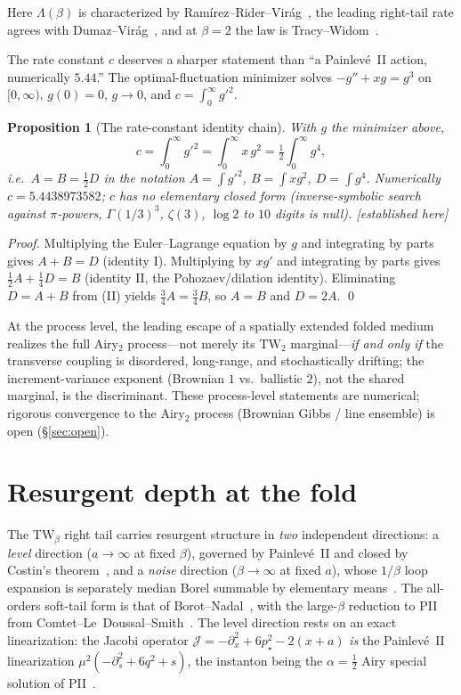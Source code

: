 \documentclass[11pt,reqno]{amsart}
\theoremstyle{plain}
\newtheorem{proposition}[theorem]{Proposition}
\theoremstyle{definition}
\theoremstyle{remark}
\newcommand{\TW}{\mathrm{TW}}
\newcommand{\tagPr}{{\footnotesize\textsf{[established here]}}}
\begin{document}
Here $\Lambda(\beta)$ is characterized by Ram\'irez--Rider--Vir\'ag~\cite{RRV}, the leading right-tail
rate agrees with Dumaz--Vir\'ag~\cite{DV}, and at $\beta{=}2$ the law is Tracy--Widom~\cite{TW1994,Bornemann}.

The rate constant $c$ deserves a sharper statement than ``a Painlev\'e~II action, numerically
$5.44$.'' The optimal-fluctuation minimizer solves $-g''+xg=g^3$ on $[0,\infty)$, $g(0)=0$,
$g\to0$, and $c=\int_0^\infty g'^2$.

\begin{proposition}[The rate-constant identity chain]\label{prop:c}
With $g$ the minimizer above,
\[
c=\int_0^\infty g'^2=\int_0^\infty x\,g^2=\tfrac12\int_0^\infty g^4 ,
\]
i.e.\ $A=B=\tfrac12 D$ in the notation $A=\int g'^2$, $B=\int xg^2$, $D=\int g^4$. Numerically
$c=5.4438973582$; $c$ has no elementary closed form (inverse-symbolic search against
$\pi$-powers, $\Gamma(1/3)^3$, $\zeta(3)$, $\log2$ to $10$ digits is null). \tagPr
\end{proposition}

\begin{proof}
Multiplying the Euler--Lagrange equation by $g$ and integrating by parts gives $A+B=D$ (identity I).
Multiplying by $xg'$ and integrating by parts gives $\tfrac12A+\tfrac14D=B$ (identity II, the
Pohozaev/dilation identity). Eliminating $D=A+B$ from (II) yields $\tfrac34A=\tfrac34B$, so $A=B$
and $D=2A$. \qed
\end{proof}

At the process level, the leading escape of a spatially extended folded medium realizes the full
Airy$_2$ process---not merely its $\TW_2$ marginal---\emph{if and only if} the transverse coupling
is disordered, long-range, and stochastically drifting; the increment-variance exponent (Brownian
$1$ vs.\ ballistic $2$), not the shared marginal, is the discriminant. These process-level
statements are numerical; rigorous convergence to the Airy$_2$ process (Brownian Gibbs / line
ensemble) is open (\S\ref{sec:open}).

\section{Resurgent depth at the fold}\label{sec:twbeta}

The $\TW_\beta$ right tail carries resurgent structure in \emph{two} independent directions: a
\emph{level} direction ($a\to\infty$ at fixed $\beta$), governed by Painlev\'e~II and closed by
Costin's theorem~\cite{Costin,CCK}, and a \emph{noise} direction ($\beta\to\infty$ at fixed $a$),
whose $1/\beta$ loop expansion is separately median Borel summable by elementary
means~\cite{Sokal}. The all-orders soft-tail form is that of Borot--Nadal~\cite{BorotNadal}, with the
large-$\beta$ reduction to PII from Comtet--Le~Doussal--Smith~\cite{CLDS}. The level direction rests
on an exact linearization: the Jacobi operator $\mathcal J=-\partial_x^2+6p_\star^2-2(x+a)$
\emph{is} the Painlev\'e~II linearization $\mu^2(-\partial_s^2+6q^2+s)$, the instanton being the
$\alpha=\tfrac12$ Airy special solution of PII~\cite{FN1980,JMU1981,FIKN,Clarkson}.
\end{document}
